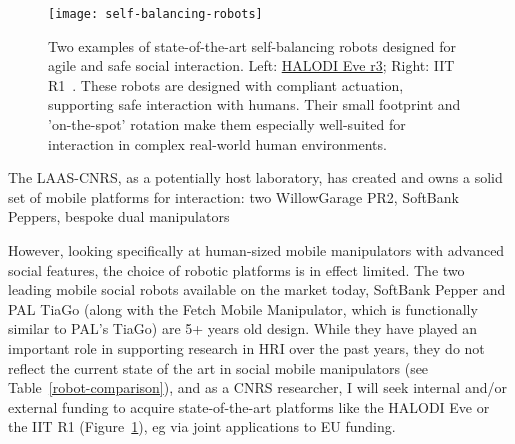 \begin{figure}[ht]
    \centering
    \texttt{[image: self-balancing-robots]}
    \caption{Two examples of state-of-the-art self-balancing robots designed for
    agile and safe social interaction.  Left:
    \href{https://www.halodi.com/ever3}{HALODI Eve r3}; Right: IIT
    R1~\parencite{parmiggiani2017design}. These robots are designed with
   compliant actuation, supporting safe interaction with humans. Their small
    footprint and 'on-the-spot' rotation make them especially
   well-suited for interaction in complex real-world human environments.}
    \label{fig:selfbalancingrobots}
\end{figure}

The LAAS-CNRS, as a potentially host laboratory, has created and owns a solid
set of mobile platforms for interaction: two WillowGarage PR2, SoftBank Peppers,
bespoke dual manipulators

However, looking specifically at human-sized mobile manipulators with advanced
social features, the choice of robotic platforms is in effect limited.  The two
leading mobile social robots available on the market today, SoftBank Pepper and
PAL TiaGo (along with the Fetch Mobile Manipulator, which is functionally
similar to PAL's TiaGo) are 5+ years old design. While they have played an
important role in supporting research in HRI over the past years, they do not
reflect the current state of the art in social mobile manipulators (see
Table~\ref{robot-comparison}), and as a CNRS researcher, I will seek internal
and/or external funding to acquire state-of-the-art platforms like the HALODI
Eve or the IIT R1 (Figure~\ref{fig:selfbalancingrobots}), eg via joint
applications to EU funding.



